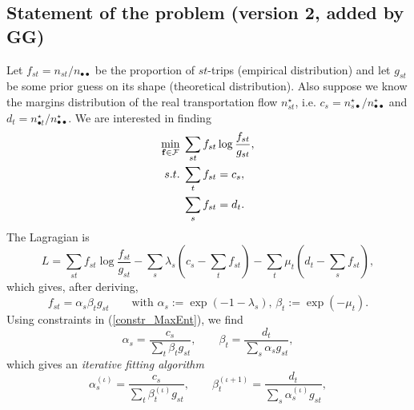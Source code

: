 \documentclass{llncs}
\begin{document}
\subsection{Statement of the problem (version 2, added by GG)}
Let $f_{st}=n_{st}/n_{\bullet\bullet}$ be the proportion of $st$-trips (empirical distribution) and let $g_{st}$ be some prior guess on its shape (theoretical distribution). Also suppose we know the margins distribution of the real transportation flow $n^\star_{st}$, i.e. $c_s = n^\star_{s \bullet} / n^\star_{\bullet \bullet}$ and $d_t = n^\star_{\bullet t} / n^\star_{\bullet \bullet}$. We are interested in finding
\begin{align}
	\label{constr_MaxEnt}
	\min_{\mathbf{f}\in\mathcal{F}} &\; \sum_{st}f_{st}\log \frac{f_{st}}{g_{st}}, \notag \\
	s.t. &\; \sum_t f_{st} = c_s, \notag \\
	&\; \sum_s f_{st} = d_t.
\end{align}
The Lagragian is
\begin{equation}
	\label{Lag}
	L = \sum_{st}f_{st}\log \frac{f_{st}}{g_{st}} - \sum_s \lambda_s (c_s - \sum_t f_{st}) - \sum_t \mu_t (d_t - \sum_s f_{st}),
\end{equation}
which gives, after deriving,
\begin{equation}
	\label{Sol}
	f_{st} = \alpha_s \beta_t g_{st} \qquad \text{with } \alpha_s := \exp(- 1 - \lambda_s) \text{, } \beta_t := \exp(- \mu_t).
\end{equation}
Using constraints in (\ref{constr_MaxEnt}), we find
\begin{equation}
	\label{Sol_LagMult}
	\alpha_s = \frac{c_s}{\sum_t \beta_t g_{st}}, \qquad \beta_t = \frac{d_t}{\sum_s \alpha_s g_{st}}, 
\end{equation}
which gives an \emph{iterative fitting algorithm}
\begin{equation}
	\label{Iterative fitting}
	\alpha^{(\iota)}_s = \frac{c_s}{\sum_t \beta^{(\iota)}_t g_{st}}, \qquad \beta^{(\iota + 1)}_t = \frac{d_t}{\sum_s \alpha^{(\iota)}_s g_{st}}, 
\end{equation}
\end{document}

